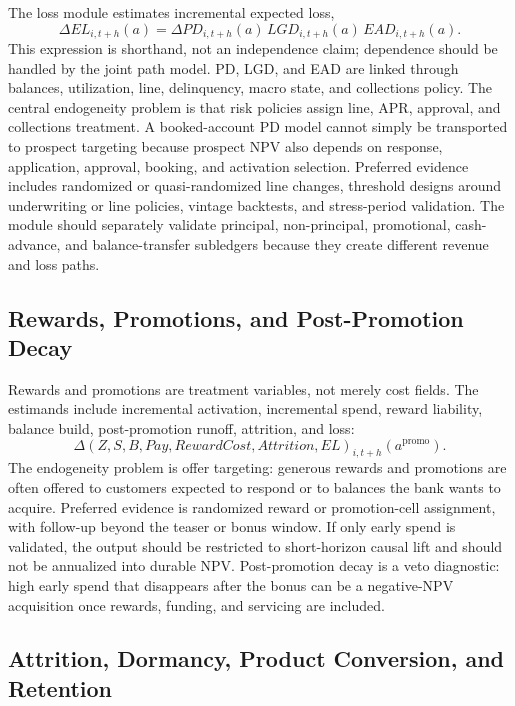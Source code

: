 \documentclass[11pt]{article}
\newcommand{\1}{\mathbf{1}}
\begin{document}
The loss module estimates incremental expected loss,
\[
  \Delta EL_{i,t+h}(a)
  =
  \Delta PD_{i,t+h}(a)\,LGD_{i,t+h}(a)\,EAD_{i,t+h}(a).
\]
This expression is shorthand, not an independence claim; dependence should be
handled by the joint path model. PD, LGD, and EAD are linked through balances,
utilization, line, delinquency, macro state, and collections policy. The
central endogeneity problem is that risk policies assign line, APR, approval,
and collections treatment. A booked-account PD model cannot simply be
transported to prospect targeting because prospect NPV also depends on
response, application, approval, booking, and activation selection. Preferred
evidence includes randomized or quasi-randomized line changes, threshold
designs around underwriting or line policies, vintage backtests, and
stress-period validation. The module should separately validate principal,
non-principal, promotional, cash-advance, and balance-transfer subledgers
because they create different revenue and loss paths.

\subsection*{Rewards, Promotions, and Post-Promotion Decay}

Rewards and promotions are treatment variables, not merely cost fields. The
estimands include incremental activation, incremental spend, reward liability,
balance build, post-promotion runoff, attrition, and loss:
\[
  \Delta (Z,S,B,Pay,RewardCost,Attrition,EL)_{i,t+h}(a^{\mathrm{promo}}).
\]
The endogeneity problem is offer targeting: generous rewards and promotions
are often offered to customers expected to respond or to balances the bank
wants to acquire. Preferred evidence is randomized reward or promotion-cell
assignment, with follow-up beyond the teaser or bonus window. If only early
spend is validated, the output should be restricted to short-horizon causal
lift and should not be annualized into durable NPV. Post-promotion decay is a
veto diagnostic: high early spend that disappears after the bonus can be a
negative-NPV acquisition once rewards, funding, and servicing are included.

\subsection*{Attrition, Dormancy, Product Conversion, and Retention}
\end{document}
